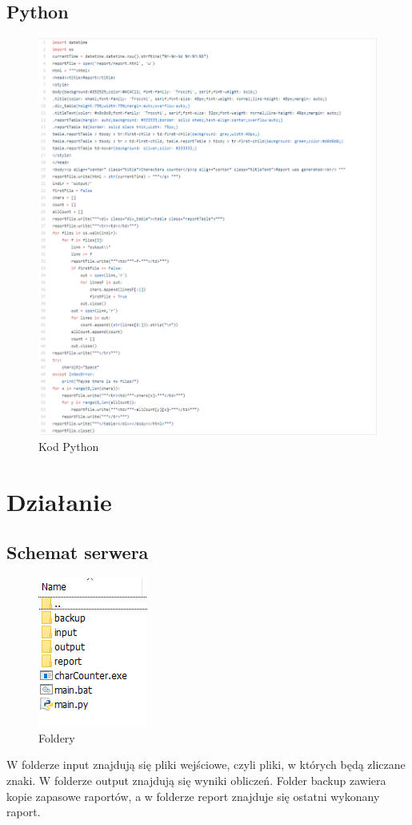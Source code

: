 \documentclass[]{article}
\begin{document}
\subsection{Python}
\begin{figure}[H]
	\centering
	\includegraphics[width=1\linewidth]{python_code}
	\caption{Kod Python}
	\label{fig:pythoncode}
\end{figure}
\section{Działanie}
\subsection{Schemat serwera}
\begin{figure}[H]
	\centering
	\includegraphics[width=0.4\linewidth]{folders}
	\caption{Foldery}
	\label{fig:folders}
\end{figure}
W folderze input znajdują się pliki wejściowe, czyli pliki, w których będą zliczane znaki. W folderze output znajdują się wyniki obliczeń. Folder backup zawiera kopie zapasowe raportów, a w folderze report znajduje się ostatni wykonany raport.
\end{document}
